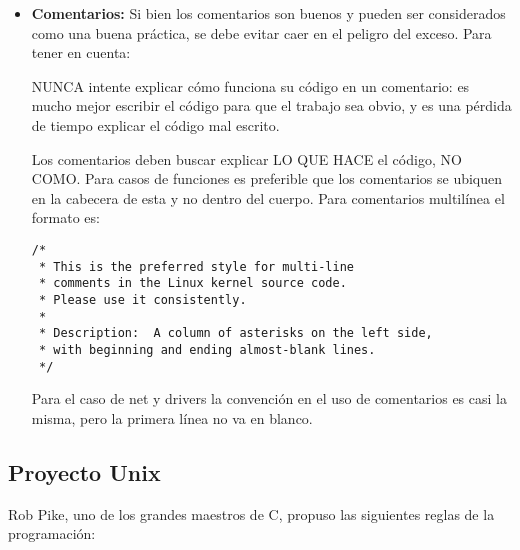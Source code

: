 \begin{itemize}
\item\textbf{Comentarios:}
Si bien los comentarios son buenos y pueden ser considerados como una buena práctica, se debe evitar caer en el peligro del exceso.
Para tener en cuenta:

NUNCA intente explicar cómo funciona su código en un comentario: es mucho mejor escribir el código para que el trabajo sea obvio, y es una pérdida de tiempo explicar el código mal escrito.

Los comentarios deben buscar explicar LO QUE HACE el código, NO COMO.
Para casos de funciones es preferible que los comentarios se ubiquen en la cabecera de esta y no dentro del cuerpo.
Para comentarios multilínea el formato es:
\begin{verbatim}
/*
 * This is the preferred style for multi-line
 * comments in the Linux kernel source code.
 * Please use it consistently.
 *
 * Description:  A column of asterisks on the left side,
 * with beginning and ending almost-blank lines.
 */
\end{verbatim}
Para el caso de net y drivers la convención en el uso de comentarios es casi la misma, pero la primera línea no va en blanco.

\end{itemize}



\subsection{Proyecto Unix}



{Rob Pike, uno de los grandes maestros de C, propuso las siguientes reglas de la programación:}


